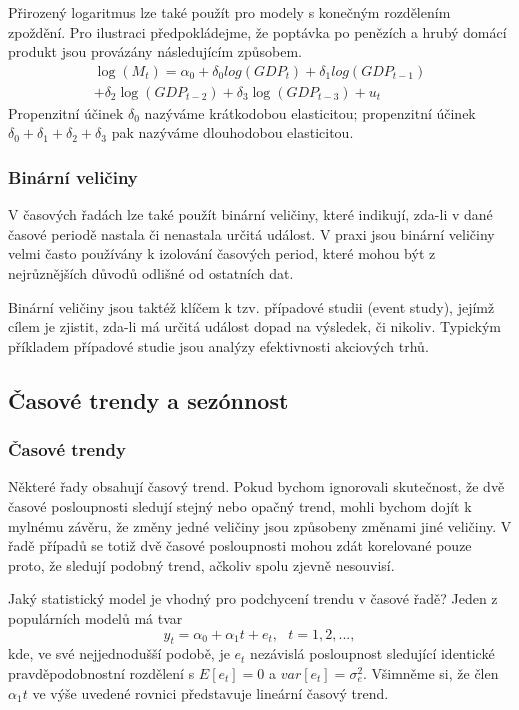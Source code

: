 Přirozený logaritmus lze také použít pro modely s konečným rozdělením
zpoždění. Pro ilustraci předpokládejme, že poptávka po 
penězích a hrubý domácí produkt jsou provázány následujícím způsobem.
\begin{multline}
\log(M_t) = \alpha_0 + \delta_0 log(GDP_t) + \delta_1 log(GDP_{t - 
1})\\
+ \delta_2 \log(GDP_{t - 2}) + \delta_3 \log(GDP_{t - 3}) + u_t
\end{multline}
Propenzitní účinek $\delta_0$ nazýváme krátkodobou elasticitou; 
propenzitní účinek $\delta_0 + \delta_1 + \delta_2 + \delta_3$ pak
nazýváme dlouhodobou elasticitou.

\subsubsection{Binární veličiny}

V časových řadách lze také použít binární veličiny, které 
indikují, zda-li v dané časové periodě nastala či nenastala 
určitá událost. V praxi jsou binární veličiny velmi často 
používány k izolování časových period, které mohou 
být z nejrůznějších důvodů odlišné od ostatních dat.

Binární veličiny jsou taktéž klíčem k tzv. případové studii 
(event study), jejímž cílem je zjistit, zda-li má určitá událost 
dopad na výsledek, či nikoliv. Typickým příkladem případové 
studie jsou analýzy efektivnosti akciových trhů.

\subsection{Časové trendy a sezónnost}

\subsubsection{Časové trendy}

Některé řady obsahují časový trend. Pokud bychom ignorovali 
skutečnost, že dvě časové posloupnosti sledují stejný nebo opačný 
trend, mohli bychom dojít k mylnému závěru, že změny jedné 
veličiny jsou způsobeny změnami jiné veličiny. V řadě případů 
se totiž dvě časové posloupnosti mohou zdát korelované pouze 
proto, že sledují podobný trend, ačkoliv spolu zjevně nesouvisí.

Jaký statistický model je vhodný pro podchycení trendu v časové 
řadě? Jeden z populárních modelů má tvar
\begin{equation}
y_t = \alpha_0 + \alpha_1t + e_t, ~~~ t = 1, 2, ...,
\end{equation}
kde, ve své nejjednodušší podobě, je ${e_t}$ nezávislá 
posloupnost sledující identické pravděpodobnostní rozdělení s 
$E[e_t] = 0$ a $var[e_t] = \sigma^2_e$. Všimněme si, že člen 
$\alpha_1 t$ ve výše uvedené rovnici představuje lineární časový trend.

